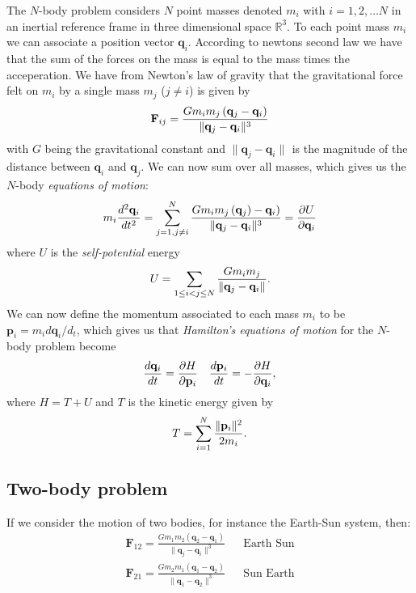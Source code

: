 \documentclass[a4paper, 11pt]{article}
\begin{document}
The $N$-body problem considers $N$ point masses denoted $m_i$ with $i = 1, 2,
\ldots N$ in an inertial reference frame in three dimensional space
$\mathbb{R}^3$. To each point mass $m_i$ we can associate a position vector
$\mathbf{q}_i$.  According to newtons second law we have that the sum of the
forces on the mass is equal to the mass times the acceperation. We have from
Newton's law of gravity that the gravitational force felt on $m_i$ by a single
mass $m_j$ ($j \neq i$) is given by
\begin{equation}
    \notag
    \mathbf{F}_{ij} = \frac{Gm_im_j \left( \mathbf{q}_j - \mathbf{q}_i \right)}{\|\mathbf{q}_j - \mathbf{q}_i\|_{}^3}
\end{equation}
with $G$ being the gravitational constant and $\|\mathbf{q}_j -
\mathbf{q}_i\|_{}$ is the magnitude of the distance between $\mathbf{q}_i$ and
$\mathbf{q}_j$.
We can now sum over all masses, which gives us the $N$-body \emph{equations of
motion}:
\begin{equation}
    \notag
    m_i \frac{d^2\mathbf{q}_i}{dt^2} = \sum^{N}_{j=1, j\neq i} \frac{Gm_im_j \left( \mathbf{q}_j \right) - \mathbf{q}_i)}{\|\mathbf{q}_j - \mathbf{q}_i\|_{}^3} = \frac{\partial U}{\partial \mathbf{q}_i}
\end{equation}
where $U$ is the \emph{self-potential} energy
\begin{equation}
    \notag
    U = \sum^{}_{1 \leq i < j \leq N} \frac{Gm_im_j}{\|\mathbf{q}_j-\mathbf{q}_i \|_{}}.
\end{equation}
We can now define the momentum associated to each mass $m_i$ to be $\mathbf{p}_i = m_id\mathbf{q}_i/d_t$, which gives us that \emph{Hamilton's equations of motion} for the $N$-body problem become
\begin{align*}
    \notag
    \frac{d\mathbf{q}_i}{dt} = \frac{\partial H}{\partial \mathbf{p}_i} && \frac{d\mathbf{p}_i}{dt} = -\frac{\partial H}{\partial \mathbf{q}_i},
\end{align*}
where $H = T + U$ and $T$ is the kinetic energy given by
\begin{equation}
    \notag
    T = \sum^{N}_{i=1} \frac{\|\mathbf{p}_i\|_{}^2}{2m_i}.
\end{equation}

\subsection{Two-body problem}
\label{sub:two_body_problem}

If we consider the motion of two bodies, for instance the Earth-Sun system, then:
\begin{align*}
    \mathbf{F}_{12} = \frac{Gm_1m_2 \left( \mathbf{q}_2 - \mathbf{q}_1 \right)}{\|\mathbf{q}_j - \mathbf{q}_i\|_{}^3} && \text{Earth Sun} \\
    \mathbf{F}_{21} = \frac{Gm_2m_1 \left( \mathbf{q}_1 - \mathbf{q}_2 \right)}{\|\mathbf{q}_1 - \mathbf{q}_2\|_{}^3} && \text{Sun Earth}
\end{align*}
\end{document}
